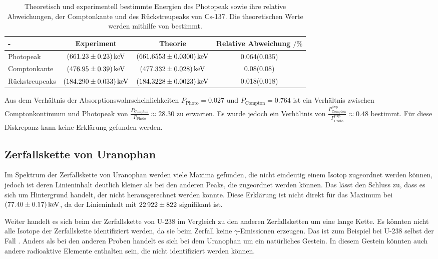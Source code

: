 \begin{table}
    \centering
    \caption{Theoretisch und experimentell bestimmte Energien des Photopeak sowie ihre relative Abweichungen, der Comptonkante und des Rückstreupeaks von Cs-137. Die theoretischen Werte werden mithilfe von \cite{LNHB} bestimmt.}
    \label{tab:CaesiumEnergienVergleich}
    \begin{tabular}{l S[table-format=3.2(4), separate-uncertainty] S[table-format=3.4(4), separate-uncertainty]  S[table-format=1.3(4)]}
        \toprule
        {-} & {Experiment} & {Theorie} & {Relative Abweichung $ \mathbin{/} \%$}\\
        \midrule 
        Photopeak       & $\SI{661.23 \pm 0.23 }{\kilo\eV}$ & $\SI{661.6553 \pm 0.030}{\kilo\eV}$      & 0.064(0.035) \\ 
        Comptonkante    & $\SI{476.95 \pm 0.39 }{\kilo\eV}$ & $\SI{477.332 \pm 0.028}{\kilo\eV}$       & 0.08(0.08) \\ 
        Rückstreupeaks  & $\SI{184.290 \pm 0.033 }{\kilo\eV}$ & $\SI{184.3228 \pm 0.0023}{\kilo\eV}$   & 0.018(0.018) \\ 
        \bottomrule
    \end{tabular}
\end{table}

Aus dem Verhältnis der Absorptionswahrscheinlichkeiten $P_\text{Photo} = \num{0.027}$ und $P_\text{Compton} = \num{0.764}$ 
ist ein Verhältnis zwischen Comptonkontinuum und Photopeak von $\frac{P_\text{Compton}}{P_\text{Photo}} \approx 28.30$ zu erwarten.
Es wurde jedoch ein Verhältnis von $\frac{P^{\text{Exp}}_\text{Compton}}{P^{\text{Exp}}_\text{Photo}} \approx 0.48$ bestimmt.
Für diese Diskrepanz kann keine Erklärung gefunden werden.


\subsection{Zerfallskette von Uranophan}

Im Spektrum der  Zerfallskette von Uranophan werden viele Maxima gefunden, die nicht eindeutig einem Isotop zugeordnet werden können,
jedoch ist deren Linieninhalt deutlich kleiner als bei den anderen Peaks, die zugeordnet werden können.
Das lässt den Schluss zu, dass es sich um Hintergrund handelt, der nicht herausgerechnet werden konnte.
Diese Erklärung ist nicht direkt für das Maximum bei $\SI{77.40 \pm 0.17}{\kilo\eV}$, da der Linieninhalt mit $\num{22 922 \pm 822}$ signifikant ist.

Weiter handelt es sich beim der Zerfallskette von U-238 im Vergleich zu den anderen Zerfallsketten um eine lange Kette.
Es könnten nicht alle Isotope der Zerfallskette identifiziert werden, da sie beim Zerfall keine $\gamma$-Emissionen erzeugen.
Das ist zum Beispiel bei U-238 selbst der Fall \cite{LNHB}. 
Anders als bei den anderen Proben handelt es sich bei dem Uranophan um ein natürliches Gestein.
In diesem Gestein könnten auch andere radioaktive Elemente enthalten sein, die nicht identifiziert werden können. 
